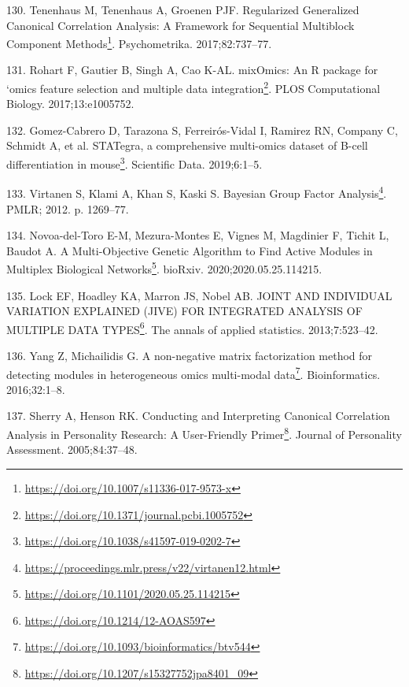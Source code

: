 \documentclass[
  12pt,
  a4paper,
  twoside,
  openright]{book}
\DeclareRobustCommand{\href}[2]{#2\footnote{\url{#1}}}
\newlength{\cslhangindent}
\newlength{\cslentryspacingunit} %
\newenvironment{CSLReferences}[2] %
 {%
  \setlength{\parindent}{0pt}
  \ifodd #1
  \let\oldpar\par
  \def\par{\hangindent=\cslhangindent\oldpar}
  \fi
  \setlength{\parskip}{#2\cslentryspacingunit}
 }%
 {}
\begin{document}
\begin{CSLReferences}{0}{0}
\leavevmode{}%
130. Tenenhaus M, Tenenhaus A, Groenen PJF. \href{https://doi.org/10.1007/s11336-017-9573-x}{Regularized Generalized Canonical Correlation Analysis: A Framework for Sequential Multiblock Component Methods}. Psychometrika. 2017;82:737--77.

\leavevmode{}%
131. Rohart F, Gautier B, Singh A, Cao K-AL. \href{https://doi.org/10.1371/journal.pcbi.1005752}{mixOmics: An R package for {`}omics feature selection and multiple data integration}. PLOS Computational Biology. 2017;13:e1005752.

\leavevmode{}%
132. Gomez-Cabrero D, Tarazona S, Ferreirós-Vidal I, Ramirez RN, Company C, Schmidt A, et al. \href{https://doi.org/10.1038/s41597-019-0202-7}{STATegra, a comprehensive multi-omics dataset of B-cell differentiation in mouse}. Scientific Data. 2019;6:1--5.

\leavevmode{}%
133. Virtanen S, Klami A, Khan S, Kaski S. \href{https://proceedings.mlr.press/v22/virtanen12.html}{Bayesian Group Factor Analysis}. PMLR; 2012. p. 1269--77.

\leavevmode{}%
134. Novoa-del-Toro E-M, Mezura-Montes E, Vignes M, Magdinier F, Tichit L, Baudot A. \href{https://doi.org/10.1101/2020.05.25.114215}{A Multi-Objective Genetic Algorithm to Find Active Modules in Multiplex Biological Networks}. bioRxiv. 2020;2020.05.25.114215.

\leavevmode{}%
135. Lock EF, Hoadley KA, Marron JS, Nobel AB. \href{https://doi.org/10.1214/12-AOAS597}{JOINT AND INDIVIDUAL VARIATION EXPLAINED (JIVE) FOR INTEGRATED ANALYSIS OF MULTIPLE DATA TYPES}. The annals of applied statistics. 2013;7:523--42.

\leavevmode{}%
136. Yang Z, Michailidis G. \href{https://doi.org/10.1093/bioinformatics/btv544}{A non-negative matrix factorization method for detecting modules in heterogeneous omics multi-modal data}. Bioinformatics. 2016;32:1--8.

\leavevmode{}%
137. Sherry A, Henson RK. \href{https://doi.org/10.1207/s15327752jpa8401_09}{Conducting and Interpreting Canonical Correlation Analysis in Personality Research: A User-Friendly Primer}. Journal of Personality Assessment. 2005;84:37--48.


\end{CSLReferences}
\end{document}
